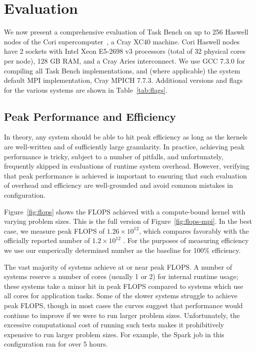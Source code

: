 \section{Evaluation}
\label{sec:evaluation}



We now present a comprehensive evaluation of Task Bench on up to 256
Haswell nodes of the Cori supercomputer~\cite{Cori}, a Cray XC40
machine. Cori Haswell nodes have 2 sockets with Intel Xeon E5-2698 v3
processors (total of 32 physical cores per node), 128 GB RAM, and a
Cray Aries interconnect. We use GCC 7.3.0 for compiling all Task Bench
implementations, and (where applicable) the system default MPI
implementation, Cray MPICH 7.7.3. Additional versions and flags for the
various systems are shown in Table~\ref{tab:flags}.

\subsection{Peak Performance and Efficiency}






In theory, any system should be able to hit peak efficiency as long as
the kernels are well-written and of sufficiently large granularity. In
practice, achieving peak performance is tricky, subject to a number of
pitfalls, and unfortunately, frequently skipped in evaluations of
runtime system overhead. However, verifying that peak performance is
achieved is important to ensuring that such evaluation of overhead and
efficiency are well-grounded and avoid common mistakes in
configuration.

Figure~\ref{fig:flops} shows the FLOPS achieved with a compute-bound
kernel with varying problem sizes. This is the full version of
Figure~\ref{fig:flops-mpi}. In the best case, we measure peak FLOPS of
$1.26 \times 10^{12}$, which compares favorably with the officially
reported number of $1.2 \times 10^{12}$ \cite{Cori}. For the purposes
of measuring efficiency we use our emperically determined number as
the baseline for 100\% efficiency.

The vast majority of systems achieve at or near peak FLOPS. A number
of systems reserve a number of cores (usually 1 or 2) for internal
runtime usage; these systems take a minor hit in peak FLOPS compared
to systems which use all cores for application tasks. Some of the
slower systems struggle to achieve peak FLOPS, though in most cases
the curves suggest that performance would continue to improve if we
were to run larger problem sizes. Unfortunately, the excessive
computational cost of running such tests makes it prohibitively
expensive to run larger problem sizes. For example, the Spark job in
this configuration ran for over 5 hours.

